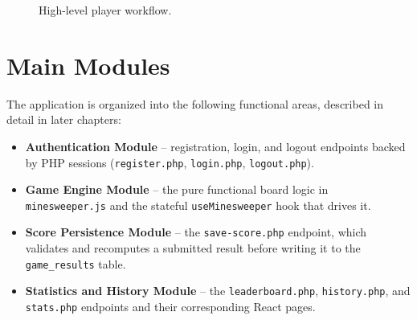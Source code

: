 \begin{figure}[h]
    \centering
    \caption{High-level player workflow.}
    \label{fig:user-flow}
\end{figure}

\section{Main Modules}
The application is organized into the following functional areas, described
in detail in later chapters:
\begin{itemize}[nosep]
    \item \textbf{Authentication Module} -- registration, login, and logout
    endpoints backed by PHP sessions (\texttt{register.php},
    \texttt{login.php}, \texttt{logout.php}).
    \item \textbf{Game Engine Module} -- the pure functional board logic in
    \texttt{minesweeper.js} and the stateful \texttt{useMinesweeper} hook
    that drives it.
    \item \textbf{Score Persistence Module} -- the \texttt{save-score.php}
    endpoint, which validates and recomputes a submitted result before
    writing it to the \texttt{game\_results} table.
    \item \textbf{Statistics and History Module} -- the
    \texttt{leaderboard.php}, \texttt{history.php}, and \texttt{stats.php}
    endpoints and their corresponding React pages.
\end{itemize}

